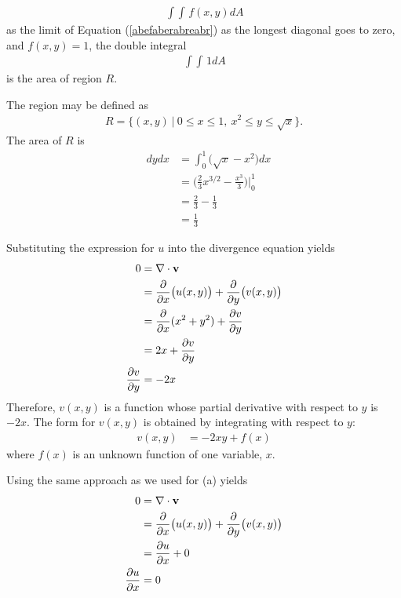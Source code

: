 \documentclass{article}
\begin{document}
\begin{align*}
  \mathop{\int \!\!\! \int} f(x,y) dA
\end{align*}
as the limit of Equation (\ref{abefaberabreabr}) as the longest diagonal goes to zero, and $f(x,y)=1$, the double integral 
\begin{align*}
  \mathop{\int \!\!\! \int} 1 dA
\end{align*}
is the area of region $R$. 
\item The region may be defined as
\begin{align*}
  R = \{ (x,y) \ | \ 0 \le x \le 1, \ x^2 \le y \le \sqrt{x} \}.
\end{align*}
The area of $R$ is 
\begin{align*}
  \mathop{\int_0^1 \!\!\! \int_{x^2}^{\sqrt{x}}} dydx 
  &= \int_0^1 \Big(\sqrt{x} - x^2 \Big) dx \\
  &= \Big(\frac{2}{3}x^{3/2}  - \frac{x^3}{3} \Big)\Big|_0^1 \\
  &= \frac{2}{3} - \frac{1}{3} \\
  &= \frac{1}{3}
\end{align*}
\EEN
\item
\BEN
\item Substituting the expression for $u$ into the divergence equation yields
\begin{align*}
  0&= \nabla \cdot \mathbf{v} \\
  &= \frac{\partial}{\partial x} \big(u(x,y)\big) + \frac{\partial}{\partial y} \big(v(x,y)\big) \\
  &= \frac{\partial}{\partial x} (x^2 + y^2) + \frac{\partial v}{\partial y}\\
  &= 2x + \frac{\partial v}{\partial y} \\
   \frac{\partial v}{\partial y} &= -2x 
\end{align*}
Therefore, $v(x,y)$ is a function whose partial derivative with respect to $y$ is $-2x$. The  form for $v(x,y)$ is obtained by integrating with respect to $y$:
\begin{align*}
 v(x,y) &= -2xy + f(x)
\end{align*}
where $f(x)$ is an unknown function of one variable, $x$. 
\item Using the same approach as we used for (a) yields
\begin{align*}
  0&= \nabla \cdot \mathbf{v} \\
  &= \frac{\partial}{\partial x} \big(u(x,y)\big) + \frac{\partial}{\partial y} \big(v(x,y)\big) \\
  &=  \frac{\partial u}{\partial x}+ 0\\
   \frac{\partial u}{\partial x} &= 0
\end{align*}
\end{document}
